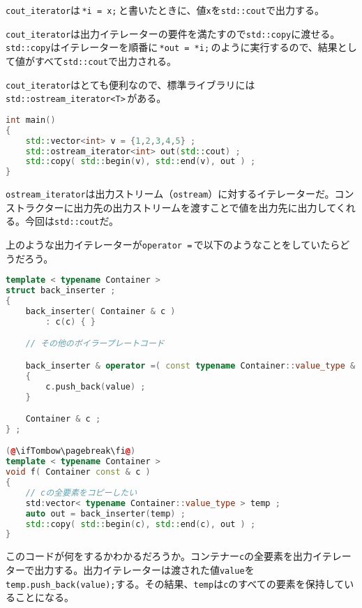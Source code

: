 \texttt{cout\_iterator}は\,\texttt{*i = x;}\,と書いたときに、値\texttt{x}を\texttt{std::cout}で出力する。

\texttt{cout\_iterator}は出力イテレーターの要件を満たすので\texttt{std::copy}に渡せる。\texttt{std::copy}はイテレーターを順番に\,\texttt{*out = *i;}\,のように実行するので、結果として値がすべて\texttt{std::cout}で出力される。

\texttt{cout\_iterator}はとても便利なので、標準ライブラリには\texttt{std::ostream\_iterator<T>}\,がある。

\begin{lstlisting}[language={C++}]
int main()
{
    std::vector<int> v = {1,2,3,4,5} ;
    std::ostream_iterator<int> out(std::cout) ;
    std::copy( std::begin(v), std::end(v), out ) ;
}
\end{lstlisting}

\texttt{ostream\_iterator}は出力ストリーム（\texttt{ostream}）に対するイテレーターだ。コンストラクターに出力先の出力ストリームを渡すことで値を出力先に出力してくれる。今回は\texttt{std::cout}だ。

上のような出力イテレーターが\texttt{operator =}\,で以下のようなことをしていたらどうだろう。

\begin{lstlisting}[language={C++}]
template < typename Container >
struct back_inserter ;
{
    back_inserter( Container & c )
        : c(c) { }

    // その他のボイラープレートコード

    back_inserter & operator =( const typename Container::value_type & value )
    {
        c.push_back(value) ;
    }

    Container & c ;
} ;

(@\ifTombow\pagebreak\fi@)
template < typename Container >
void f( Container const & c )
{
    // cの全要素をコピーしたい
    std:vector< typename Container::value_type > temp ;
    auto out = back_inserter(temp) ;
    std::copy( std::begin(c), std::end(c), out ) ;
}
\end{lstlisting}

このコードが何をするかわかるだろうか。コンテナー\texttt{c}の全要素を出力イテレーターで出力する。出力イテレーターは渡された値\texttt{value}を\texttt{temp.push\_back(value);}する。その結果、\texttt{temp}は\texttt{c}のすべての要素を保持していることになる。

